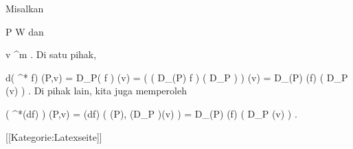 Misalkan

\mavergleichskette
{\vergleichskette
{ P
}
{ \in }{  W
}
{  }{
}
{    }{
}
{   }{
}
}
{}{}{}
dan

\mavergleichskette
{\vergleichskette
{ v
}
{ \in }{  \R^m
}
{  }{
}
{    }{
}
{   }{
}
}
{}{}{.}
Di satu pihak,

\mavergleichskettedisp
{\vergleichskette
{ d( \psi^* f) (P,v)
}
{ =} { D_P( f \circ \psi) (v)
}
{ =} { \left(  \left(  D_{\psi(P)} f  \right)  \circ \left(  D_P  \psi  \right)  \right) (v)
}
{ =} { D_{\psi(P)} (f) \left(  D_P \psi(v)  \right)
}
{ } {
}
}
{}{}{.}
Di pihak lain, kita juga memperoleh

\mavergleichskettedisp
{\vergleichskette
{ \left(  \psi^*(df)  \right) (P,v)
}
{ =} { (df) \left(  \psi(P), (D_P \psi )(v)  \right)
}
{ =} { D_{\psi(P)} (f) \left(  D_P \psi (v)  \right)
}
{ } {
}
{ } {
}
}
{}{}{.}

 [[Kategorie:Latexseite]]
